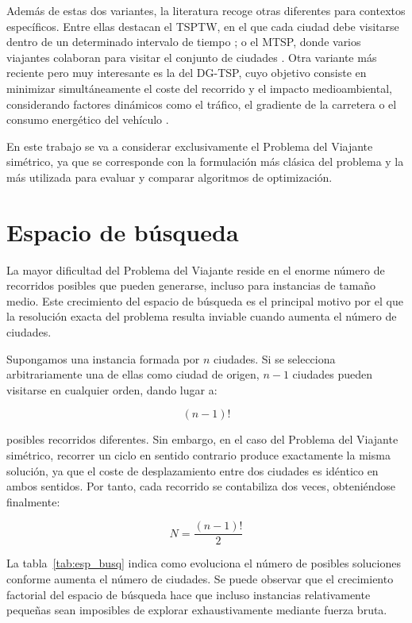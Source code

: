 Además de estas dos variantes, la literatura recoge otras diferentes para contextos específicos. Entre ellas destacan el 
\ac{TSPTW}, en el que cada ciudad debe visitarse dentro de un determinado intervalo de tiempo \cite{dumas1995}; o el \ac{MTSP},
donde varios viajantes colaboran para visitar el conjunto de ciudades \cite{bektas2006}. Otra variante más reciente pero muy
interesante es la del \ac{DG-TSP}, cuyo objetivo consiste en minimizar simultáneamente el coste del recorrido y el impacto 
medioambiental, considerando factores dinámicos como el tráfico, el gradiente de la carretera o el consumo energético 
del vehículo \cite{benjelloun2025}.

En este trabajo se va a considerar exclusivamente el Problema del Viajante simétrico, ya que se corresponde con
la formulación más clásica del problema y la más utilizada para evaluar y comparar algoritmos de optimización.

\section{Espacio de búsqueda}
\label{sec:esp_busqueda}

La mayor dificultad del Problema del Viajante reside en el enorme número de recorridos posibles que pueden generarse, incluso 
para instancias de tamaño medio. Este crecimiento del espacio de búsqueda es el principal motivo por el que la resolución
exacta del problema resulta inviable cuando aumenta el número de ciudades.

Supongamos una instancia formada por $n$ ciudades. Si se selecciona arbitrariamente una de ellas como ciudad de origen, 
$n-1$ ciudades pueden visitarse en cualquier orden, dando lugar a:

\begin{equation}
  \label{eq:eq5}
    (n-1)!
\end{equation}

posibles recorridos diferentes. Sin embargo, en el caso del Problema del Viajante simétrico, recorrer un ciclo en sentido 
contrario produce exactamente la misma solución, ya que el coste de desplazamiento entre dos ciudades es idéntico en ambos
sentidos. Por tanto, cada recorrido se contabiliza dos veces, obteniéndose finalmente:

\begin{equation}
  \label{eq:eq6}
    N=\frac{(n-1)!}{2}
\end{equation}

La tabla~\ref{tab:esp_busq} indica como evoluciona el número de posibles soluciones conforme aumenta el número de
ciudades. Se puede observar que el crecimiento factorial del espacio de búsqueda hace que incluso instancias relativamente
pequeñas sean imposibles de explorar exhaustivamente mediante fuerza bruta.


